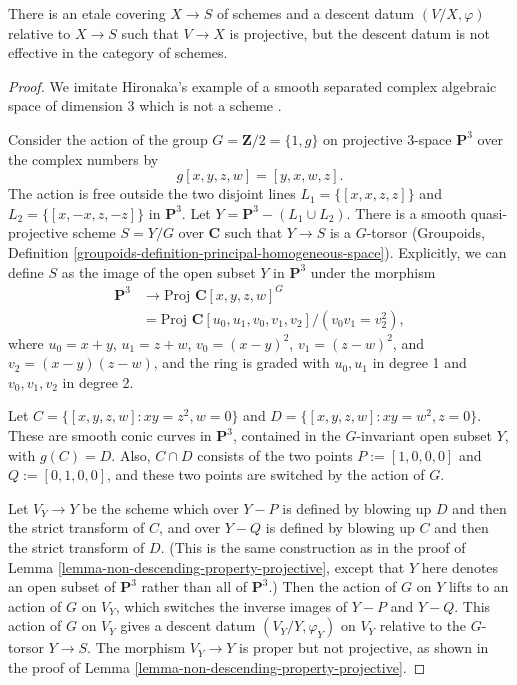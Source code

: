 %
\begin{lemma}
\label{lemma-non-effective-descent-projective}
There is an etale covering $X\to S$ of schemes and a descent datum
$(V/X,\varphi)$ relative to $X\to S$ such that 
$V\to X$ is projective,
but the descent datum is not effective in the category of schemes.
\end{lemma}

\begin{proof}
We imitate Hironaka's example of a smooth separated complex
algebraic space of dimension 3
which is not a scheme \cite[Example B.3.4.2]{H}.

\medskip\noindent
Consider the action of the group $G = \mathbf{Z}/2 = \{1, g\}$
on projective 3-space
$\mathbf{P}^3$ over the complex numbers by
$$
g[x,y,z,w] = [y,x,w,z].
$$
The action is free outside the two disjoint lines
$L_1=\{ [x,x,z,z]\}$ and $L_2=\{ [x,-x,z,-z]\}$ in
${\mathbf P}^3$. Let $Y={\mathbf P}^3-(L_1\cup L_2)$. There is a
smooth quasi-projective scheme $S=Y/G$ over ${\mathbf C}$ such that
$Y\to S$ is a $G$-torsor (Groupoids,
Definition \ref{groupoids-definition-principal-homogeneous-space}).
Explicitly, we can define $S$ as the image of the open subset $Y$
in ${\mathbf P}^3$ under the morphism
\begin{align*}
{\mathbf P}^3 & \to \text{Proj } {\mathbf C}[x,y,z,w]^G\\
   & = \text{Proj } {\mathbf C}[u_0,u_1,v_0,v_1,v_2]/(v_0v_1=v_2^2),
\end{align*}
where $u_0=x+y$, $u_1=z+w$, $v_0=(x-y)^2$, $v_1=(z-w)^2$,
and $v_2=(x-y)(z-w)$, and the ring is graded with $u_0,u_1$
in degree 1 and $v_0,v_1,v_2$ in degree 2.

\medskip\noindent
Let $C=\{ [x,y,z,w]: xy=z^2, w=0\}$ and $D=\{ [x,y,z,w]:
xy=w^2, z=0\}$. These are smooth conic curves in ${\mathbf P}^3$, contained
in the $G$-invariant open subset $Y$, with $g(C)=D$. Also,
$C\cap D$ consists of the two points $P:=[1,0,0,0]$
and $Q:=[0,1,0,0]$, and these two points are switched by the action
of $G$. 

\medskip\noindent
Let $V_Y\to Y$ be the scheme which over $Y-P$
is defined by blowing up $D$ and then the strict transform
of $C$, and over $Y-Q$ is defined by blowing up $C$ and then
the strict transform of $D$. (This is the same construction
as in the proof of Lemma \ref{lemma-non-descending-property-projective},
except that $Y$ here denotes an open subset of ${\mathbf P}^3$
rather than all of ${\mathbf P}^3$.)
Then the action of $G$ on $Y$ lifts to an action of $G$ on $V_Y$,
which switches the inverse images of $Y-P$ and $Y-Q$. This action
of $G$ on $V_Y$ gives a descent datum $(V_Y/Y,\varphi_Y)$
on $V_Y$ relative to the $G$-torsor
$Y\to S$. The morphism $V_Y\to Y$
is proper but not projective, as shown in the proof
of Lemma \ref{lemma-non-descending-property-projective}.


\end{proof}
